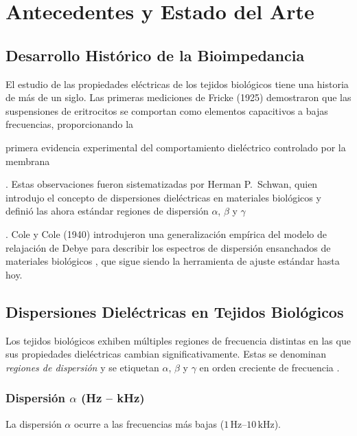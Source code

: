 \documentclass[12pt]{article}
\begin{document}
\section{Antecedentes y Estado del Arte}

\label{sec:background}


\subsection{Desarrollo Hist\'orico de la Bioimpedancia}

El estudio de las propiedades el\'ectricas de los tejidos biol\'ogicos tiene una historia de m\'as
de un siglo. Las primeras mediciones de Fricke (1925) demostraron que las suspensiones de
eritrocitos se comportan como elementos capacitivos a bajas frecuencias, proporcionando la

primera evidencia experimental del comportamiento diel\'ectrico controlado por la membrana

\citep{Fricke1925, Schwan1957}. Estas observaciones fueron sistematizadas por Herman P.\
Schwan, quien introdujo el concepto de dispersiones diel\'ectricas en materiales biol\'ogicos
y defini\'o las ahora est\'andar regiones de dispersi\'on $\alpha$, $\beta$ y $\gamma$

\citep{Schwan1957, Schwan1994}. Cole y Cole (1940) introdujeron una generalizaci\'on emp\'irica
del modelo de relajaci\'on de Debye para describir los espectros de dispersi\'on ensanchados de
materiales biol\'ogicos \citep{Cole1940}, que sigue siendo la herramienta de ajuste est\'andar
hasta hoy.

\subsection{Dispersiones Diel\'ectricas en Tejidos Biol\'ogicos}

\label{sec:dispersiones}

Los tejidos biol\'ogicos exhiben m\'ultiples regiones de frecuencia distintas en las que sus
propiedades diel\'ectricas cambian significativamente. Estas se denominan \emph{regiones de
dispersi\'on} y se etiquetan $\alpha$, $\beta$ y $\gamma$ en orden creciente de frecuencia
\citep{Schwan1957, Foster1989}.

\subsubsection{Dispersi\'on \texorpdfstring{$\alpha$}{Alfa} (Hz -- kHz)} La dispersi\'on $\alpha$
ocurre a las frecuencias m\'as bajas ($1\,\text{Hz}$--$10\,\text{kHz}$).
\end{document}
